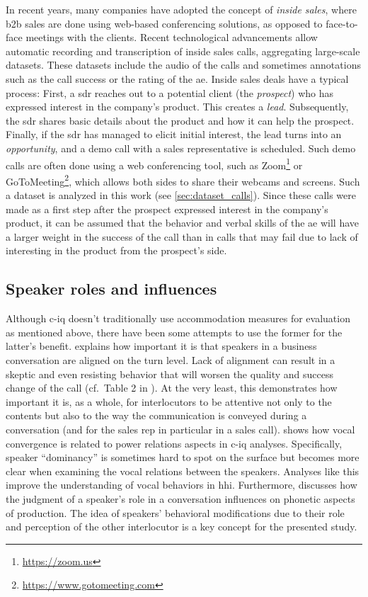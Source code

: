In recent years, many companies have adopted the concept of \emph{inside sales}, where \ac{b2b} sales are done using web-based conferencing solutions, as opposed to face-to-face meetings with the clients.
Recent technological advancements allow automatic recording and transcription of inside sales calls, aggregating large-scale datasets.
These datasets include the audio of the calls and sometimes annotations such as the call success or the rating of the \ac{ae}.
Inside sales deals have a typical process:
First, a \ac{sdr} reaches out to a potential client (the \emph{prospect}) who has expressed interest in the company's product.
This creates a \emph{lead}.
Subsequently, the \ac{sdr} shares basic details about the product and how it can help the prospect.
Finally, if the \ac{sdr} has managed to elicit initial interest, the lead turns into an \emph{opportunity}, and a demo call with a sales representative is scheduled.
Such demo calls are often done using a web conferencing tool, such as Zoom\footnote{\url{https://zoom.us}} or GoToMeeting\footnote{\url{https://www.gotomeeting.com}}, which allows both sides to share their webcams and screens.
Such a dataset is analyzed in this work (see \cref{sec:dataset_calls}).
Since these calls were made as a first step after the prospect expressed interest in the company's product, it can be assumed that the behavior and verbal skills of the \ac{ae} will have a larger weight in the success of the call than in calls that may fail due to lack of interesting in the product from the prospect's side.

\subsection{Speaker roles and influences}
\label{subsec:speaker_roles_and_influences}

Although \ac{c-iq} doesn't traditionally use accommodation measures for evaluation as mentioned above, there have been some attempts to use the former for the latter's benefit.
\citet{Glaser2016conversational} explains how important it is that speakers in a business conversation are aligned on the turn level.
Lack of alignment can result in a skeptic and even resisting behavior that will worsen the quality and success change of the call (cf.\ Table 2 in \citet{Glaser2014conversational}).
At the very least, this demonstrates how important it is, as a whole, for interlocutors to be attentive not only to the contents but also to the way the communication is conveyed during a conversation (and for the sales rep in particular in a sales call).
\citet{SilberVarod2018human} shows how vocal convergence is related to power relations aspects in \ac{c-iq} analyses.
Specifically, speaker \enquote{dominancy} is sometimes hard to spot on the surface but becomes more clear when examining the vocal relations between the speakers.
Analyses like this improve the understanding of vocal behaviors in \ac{hhi}.
Furthermore, \citet{Abrego2011effects} discusses how the judgment of a speaker's role in a conversation influences on phonetic aspects of production.
The idea of speakers' behavioral modifications due to their role and perception of the other interlocutor is a key concept for the presented study.

